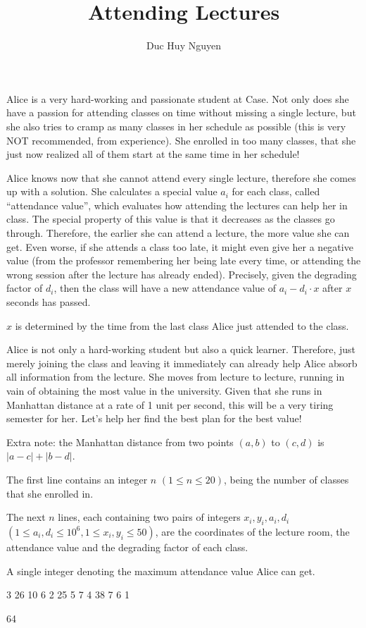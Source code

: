 \documentclass{article}
\title{Attending Lectures}
\author{Duc Huy Nguyen}
\begin{document}
\begin{problemDescription}
    Alice is a very hard-working and passionate student at Case. Not only does she have a passion for attending classes on time without missing a single lecture, but she also tries to cramp as many classes in her schedule as possible (this is very NOT recommended, from experience). She enrolled in too many classes, that she just now realized all of them start at the same time in her schedule!

Alice knows now that she cannot attend every single lecture, therefore she comes up with a solution. She calculates a special value $a_i$ for each class, called “attendance value”, which evaluates how attending the lectures can help her in class. The special property of this value is that it decreases as the classes go through. Therefore, the earlier she can attend a lecture, the more value she can get. Even worse, if she attends a class too late, it might even give her a negative value (from the professor remembering her being late every time, or attending the wrong session after the lecture has already ended). Precisely, given the degrading factor of $d_i$, then the class will have a new attendance value of $a_i - d_i \cdot x$ after $x$ seconds has passed.

$x$ is determined by the time from the last class Alice just attended to the class.

Alice is not only a hard-working student but also a quick learner. Therefore, just merely joining the class and leaving it immediately can already help Alice absorb all information from the lecture. She moves from lecture to lecture, running in vain of obtaining the most value in the university. Given that she runs in Manhattan distance at a rate of 1 unit per second, this will be a very tiring semester for her. Let’s help her find the best plan for the best value!

Extra note: the Manhattan distance from two points $(a, b)$ to $(c, d)$ is $ \lvert a - c \rvert + \lvert b - d\rvert$.


\end{problemDescription}

\begin{inputDescription}

    The first line contains an integer $n$ $(1 \leq n \leq 20)$, being the number of classes that she enrolled in.

The next $n$ lines, each containing two pairs of integers $x_i, y_i, a_i, d_i$ $(1 \leq a_i, d_i \leq 10^6, 1 \leq x_i, y_i \leq 50)$, are the coordinates of the lecture room, the attendance value and the degrading factor of each class.

\end{inputDescription}

\begin{outputDescription}
    A single integer denoting the maximum attendance value Alice can get.

\end{outputDescription}

\begin{sampleInput}
3
26 10 6 2
25 5 7 4
38 7 6 1
\end{sampleInput}
\begin{sampleOutput}
64
\end{sampleOutput}
\end{document}
